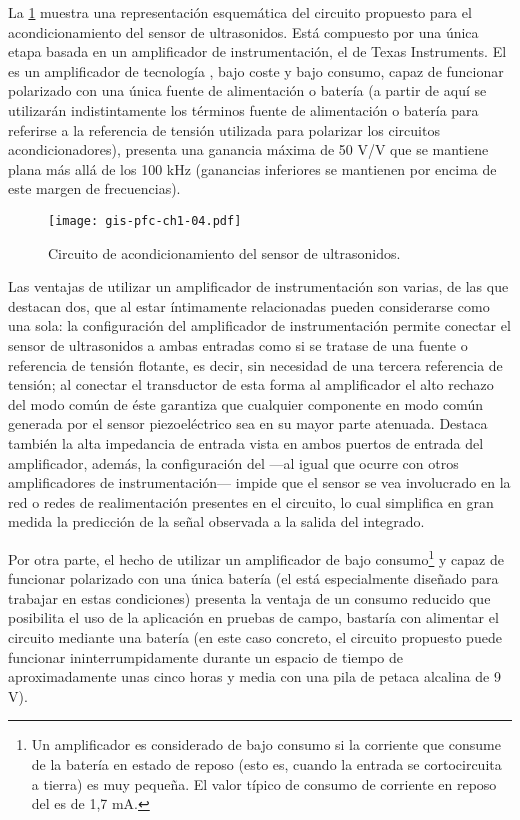 La \cref{fig:sensor-conditioner} muestra una representación esquemática del
circuito propuesto para el acondicionamiento del sensor de ultrasonidos.
Está compuesto por una única etapa basada en un amplificador de
instrumentación, el  de Texas Instruments. El  es
un amplificador de tecnología , bajo coste y bajo consumo, capaz
de funcionar polarizado con una única fuente de alimentación o batería (a
partir de aquí se utilizarán indistintamente los términos fuente de
alimentación o batería para referirse a la referencia de tensión utilizada
para polarizar los circuitos acondicionadores), presenta una ganancia
máxima de 50 V/V que se mantiene plana más allá de los 100 kHz (ganancias
inferiores se mantienen por encima de este margen de frecuencias).

\begin{figure}
    \begin{center}
	\texttt{[image: gis-pfc-ch1-04.pdf]}
    \end{center}
    \caption[Circuito de acondicionamiento del sensor
    piezoeléctrico]{Circuito de acondicionamiento del sensor de
    ultrasonidos.}
    \label{fig:sensor-conditioner}
\end{figure}

Las ventajas de utilizar un amplificador de instrumentación son varias, de
las que destacan dos, que al estar íntimamente relacionadas pueden
considerarse como una sola: la configuración del amplificador de
instrumentación permite conectar el sensor de ultrasonidos a ambas entradas
como si se tratase de una fuente o referencia de tensión flotante, es
decir, sin necesidad de una tercera referencia de tensión; al conectar el
transductor de esta forma al amplificador el alto rechazo del modo común de
éste garantiza que cualquier componente en modo común generada por el
sensor piezoeléctrico sea en su mayor parte atenuada. Destaca también la
alta impedancia de entrada vista en ambos puertos de entrada del
amplificador, además, la configuración del  ---al igual que
ocurre con otros amplificadores de instrumentación--- impide que el sensor
se vea involucrado en la red o redes de realimentación presentes en el
circuito, lo cual simplifica en gran medida la predicción de la señal
observada a la salida del integrado.

Por otra parte, el hecho de utilizar un amplificador de bajo
consumo\footnote{Un amplificador es considerado de bajo consumo si la
corriente que consume de la batería en estado de reposo (esto es, cuando la
entrada se cortocircuita a tierra) es muy pequeña. El valor típico de
consumo de corriente en reposo del  es de 1,7 mA.} y capaz de
funcionar polarizado con una única batería (el  está
especialmente diseñado para trabajar en estas condiciones) presenta la
ventaja de un consumo reducido que posibilita el uso de la aplicación en
pruebas de campo, bastaría con alimentar el circuito mediante una batería
(en este caso concreto, el circuito propuesto puede funcionar
ininterrumpidamente durante un espacio de tiempo de aproximadamente unas
cinco horas y media con una pila de petaca alcalina de 9 V).

